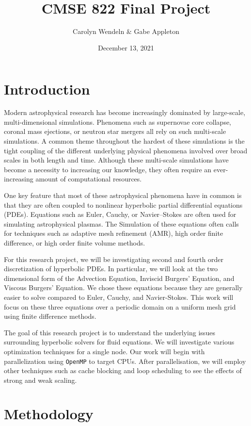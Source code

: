 \documentclass{article}
\title{CMSE 822 Final Project }
\author{Carolyn Wendeln $\&$ Gabe Appleton}
\date{December 13, 2021}
\begin{document}
\maketitle

\section{Introduction}

Modern  astrophysical  research  has  become  increasingly  dominated  by  large-scale, multi-dimensional simulations. Phenomena such as supernovae core collapse, coronal mass ejections, or neutron star mergers all rely on such multi-scale simulations. A common theme throughout the hardest of these simulations is the tight coupling of the different underlying physical phenomena involved over broad scales in both length and time. Although these multi-scale simulations have become a necessity to increasing our knowledge, they often require an ever-increasing amount of computational resources.

One key feature that most of these astrophysical phenomena have in common is that they are often coupled to nonlinear hyperbolic partial differential equations (PDEs).
Equations such as Euler, Cauchy, or Navier–Stokes are often used for simulating astrophysical plasmas. The Simulation of these equations often calls for techniques such as adaptive mesh refinement (AMR), high order finite difference, or high order finite volume methods.

For this research project, we will be investigating second and fourth order discretization of hyperbolic PDEs. In particular, we will look at the two dimensional form of the Advection Equation, Inviscid Burgers' Equation, and Viscous Burgers' Equation. We chose these equations because they are generally easier to solve compared to Euler, Cauchy, and Navier-Stokes. 
This work will focus on these three equations over a periodic domain on a uniform mesh grid using finite difference methods.

The goal of this research project is to understand the underlying issues surrounding hyperbolic solvers for fluid equations. We will investigate various optimization techniques for a single node. Our work will begin with parallelization using \texttt{OpenMP} to target CPUs. After parallelisation, we will employ other techniques such as cache blocking and loop scheduling to see the effects of strong and weak scaling.


\section{Methodology}
\end{document}
